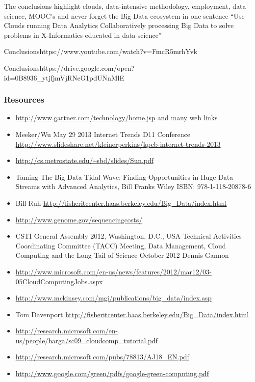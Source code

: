 The conclusions highlight clouds, data-intensive methodology,
employment, data science, MOOC's and never forget the Big Data ecosystem
in one sentence ``Use Clouds running Data Analytics Collaboratively
processing Big Data to solve problems in X-Informatics educated in data
science''


  {Conclusions}{https://www.youtube.com/watch?v=FmcR5mrhYvk}

  {Conclusions}{https://drive.google.com/open?id=0B8936_ytjfjmVjRNeG1pdUNnMlE}


\subsubsection{Resources}\label{resources}

\begin{itemize}
\item
  \url{http://www.gartner.com/technology/home.jsp} and many web links
\item
  Meeker/Wu May 29 2013 Internet Trends D11 Conference
  \url{http://www.slideshare.net/kleinerperkins/kpcb-internet-trends-2013}
\item
  \url{http://cs.metrostate.edu/~sbd/slides/Sun.pdf}
\item
  Taming The Big Data Tidal Wave: Finding Opportunities in Huge Data
  Streams with Advanced Analytics, Bill Franks Wiley ISBN:
  978-1-118-20878-6
\item
  Bill Ruh
  \url{http://fisheritcenter.haas.berkeley.edu/Big_Data/index.html}
\item
  \url{http://www.genome.gov/sequencingcosts/}
\item
  CSTI General Assembly 2012, Washington, D.C., USA Technical Activities
  Coordinating Committee (TACC) Meeting, Data Management, Cloud
  Computing and the Long Tail of Science October 2012 Dennis Gannon
\item
  \url{http://www.microsoft.com/en-us/news/features/2012/mar12/03-05CloudComputingJobs.aspx}
\item
  \url{http://www.mckinsey.com/mgi/publications/big_data/index.asp}
\item
  Tom Davenport
  \url{http://fisheritcenter.haas.berkeley.edu/Big_Data/index.html}
\item
  \url{http://research.microsoft.com/en-us/people/barga/sc09_cloudcomp_tutorial.pdf}
\item
  \url{http://research.microsoft.com/pubs/78813/AJ18_EN.pdf}
\item
  \url{http://www.google.com/green/pdfs/google-green-computing.pdf}

\end{itemize}
